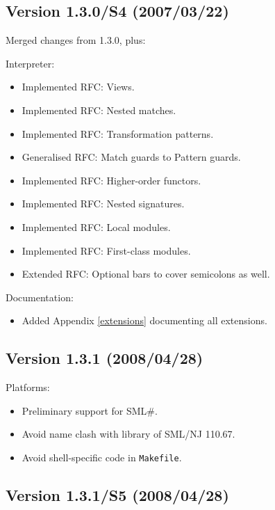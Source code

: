 \documentclass[twoside,titlepage]{article}
\begin{document}
\begin{appendix}
\subsection*{Version 1.3.0/S4 (2007/03/22)}

Merged changes from 1.3.0, plus:

Interpreter:
\begin{itemize} \setlength{\itemsep}{0em}
\item Implemented RFC: Views.
\item Implemented RFC: Nested matches.
\item Implemented RFC: Transformation patterns.
\item Generalised RFC: Match guards to Pattern guards.
\item Implemented RFC: Higher-order functors.
\item Implemented RFC: Nested signatures.
\item Implemented RFC: Local modules.
\item Implemented RFC: First-class modules.
\item Extended RFC: Optional bars to cover semicolons as well.
\end{itemize}

Documentation:
\begin{itemize} \setlength{\itemsep}{0em}
\item Added Appendix \ref{extensions} documenting all extensions.
\end{itemize}

\subsection*{Version 1.3.1 (2008/04/28)}

Platforms:
\begin{itemize} \setlength{\itemsep}{0em}
\item Preliminary support for SML\#.
\item Avoid name clash with library of SML/NJ 110.67.
\item Avoid shell-specific code in {\tt Makefile}.
\end{itemize}

\subsection*{Version 1.3.1/S5 (2008/04/28)}


\end{appendix}
\end{document}
